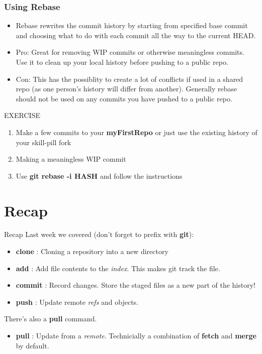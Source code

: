 \documentclass{beamer}
\begin{document}
\begin{frame}[fragile]
\frametitle{Using Rebase}
\begin{itemize}
\item Rebase rewrites the commit history by starting from specified base commit and choosing what to do with each commit all the way to the current HEAD.
\item Pro: Great for removing WIP commits or otherwise meaningless commits. Use it to clean up your local history before pushing to a public repo.
\item Con: This has the possiblity to create a lot of conflicts if used in a shared repo (as one person's history will differ from another). Generally rebase should not be used on any commits you have pushed to a public repo. 
\end{itemize}
    \begin{block}{EXERCISE}
        \begin{enumerate}
        \item Make a few commits to your \textbf{myFirstRepo} or just use the existing history of your skill-pill fork
	 \item Making a meaningless WIP commit
	 \item Use \textbf{git rebase -i \textlangle{}HASH\textrangle{}} and follow the instructions
        \end{enumerate}
    \end{block}
\end{frame}

\section{Recap}
\begin{frame}{Recap}
  Last week we covered (don't forget to prefix with \textbf{git}):
  \begin{itemize}
    \item \textbf{clone} : Cloning a repository into a new directory
    \item \textbf{add} : Add file contents to the \textit{index}. This makes git track the file.
    \item \textbf{commit} : Record changes. Store the staged files as a new part of the history!
    \item \textbf{push} : Update remote \textit{refs} and objects.
	\end{itemize}
	There\rq{}s also a \textbf{pull} command.
	\begin{itemize}
		\item \textbf{pull} : Update from a \textit{remote}. Technicially a combination of \textbf{fetch} and \textbf{merge} by default.
	\end{itemize}
\end{frame}
\end{document}
